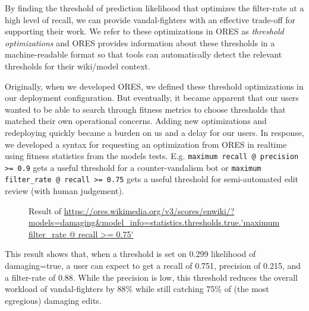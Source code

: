 By finding the threshold of prediction likelihood that optimizes the filter-rate at a high level of recall, we can provide vandal-fighters with an effective trade-off for supporting their work.  We refer to these optimizations in ORES as \emph{threshold optimizations} and ORES provides information about these thresholds in a machine-readable format so that tools can automatically detect the relevant thresholds for their wiki/model context.

Originally, when we developed ORES, we defined these threshold optimizations in our deployment configuration.  But eventually, it became apparent that our users wanted to be able to search through fitness metrics to choose thresholds that matched their own operational concerns.  Adding new optimizations and redeploying quickly became a burden on us and a delay for our users.  In response, we developed a syntax for requesting an optimization from ORES in realtime using fitness statistics from the models tests. E.g. \texttt{maximum recall @ precision >= 0.9} gets a useful threshold for a counter-vandalism bot or \texttt{maximum filter\_rate @ recall >= 0.75} gets a useful threshold for semi-automated edit review (with human judgement).

\begin{figure}[htbp]
        \caption{Result of \url{https://ores.wikimedia.org/v3/scores/enwiki/?models=damaging&model_info=statistics.thresholds.true.'maximum filter_rate @ recall >= 0.75'}}
        \label{fig:english_damaging_threshold_optimization}
\end{figure}

This result shows that, when a threshold is set on 0.299 likelihood of damaging=true, a user can expect to get a recall of 0.751, precision of 0.215, and a filter-rate of 0.88.  While the precision is low, this threshold reduces the overall workload of vandal-fighters by 88\% while still catching 75\% of (the most egregious) damaging edits.

